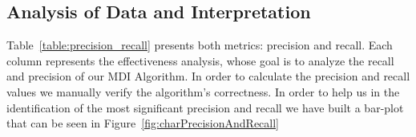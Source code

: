 
\subsection{Analysis of Data and Interpretation}\label{analysis_of_data}



Table~\ref{table:precision_recall} presents both metrics: precision and recall. Each column represents the effectiveness analysis, whose goal is to analyze the recall and precision of our MDI Algorithm. In order to calculate the precision and recall values we manually verify the algorithm's correctness. %
In order to help us in the identification of the most significant precision and recall we have built a bar-plot that can be seen in Figure~\ref{fig:charPrecisionAndRecall}

